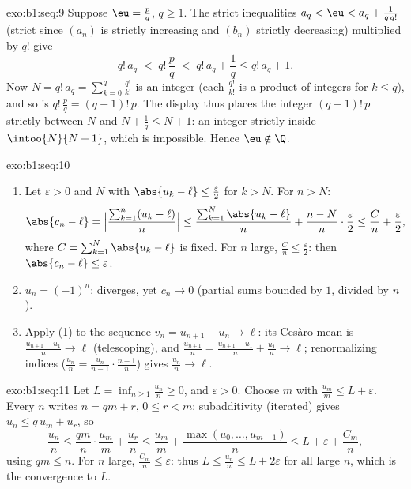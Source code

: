 \begin{solution}{exo:b1:seq:9}
Suppose $\eu = \frac pq$, $q \geq 1$. The strict inequalities $a_q <
\eu < a_q + \frac{1}{q\,q!}$ (strict since $(a_n)$ is strictly
increasing and $(b_n)$ strictly decreasing) multiplied by $q!$ give
\[
q!\,a_q \;<\; q!\,\frac pq \;<\; q!\,a_q + \frac 1q \leq q!\,a_q + 1.
\]
Now $N = q!\,a_q = \sum_{k=0}^{q} \frac{q!}{k!}$ is an integer (each
$\frac{q!}{k!}$ is a product of integers for $k \leq q$), and so is
$q!\,\frac pq = (q-1)!\,p$. The display thus places the integer
$(q-1)!\,p$ strictly between $N$ and $N + \frac 1q \leq N + 1$: an
integer strictly inside $\intoo{N}{N+1}$, which is impossible. Hence
$\eu \notin \Q$.
\end{solution}

\begin{solution}{exo:b1:seq:10}
\begin{enumerate}
  \item Let $\varepsilon > 0$ and $N$ with $\abs{u_k - \ell} \leq
        \frac{\varepsilon}{2}$ for $k > N$. For $n > N$:
        \[
        \abs{c_n - \ell}
        = \Bigl|\frac{\sum_{k=1}^{n}(u_k - \ell)}{n}\Bigr|
        \leq \frac{\sum_{k=1}^{N} \abs{u_k - \ell}}{n}
        + \frac{n - N}{n}\cdot\frac{\varepsilon}{2}
        \leq \frac{C}{n} + \frac{\varepsilon}{2},
        \]
        where $C = \sum_{k=1}^N \abs{u_k - \ell}$ is fixed. For $n$
        large, $\frac Cn \leq \frac\varepsilon2$: then $\abs{c_n -
        \ell} \leq \varepsilon$.
  \item $u_n = (-1)^n$: diverges, yet $c_n \to 0$ (partial sums
        bounded by $1$, divided by $n$).
  \item Apply (1) to the sequence $v_n = u_{n+1} - u_n \to \ell$: its
        Ces\`aro mean is $\frac{u_{n+1} - u_1}{n} \to \ell$
        (telescoping), and $\frac{u_{n+1}}{n} = \frac{u_{n+1} -
        u_1}{n} + \frac{u_1}{n} \to \ell$; renormalizing indices
        ($\frac{u_n}{n} = \frac{u_n}{n-1}\cdot\frac{n-1}{n}$) gives
        $\frac{u_n}{n} \to \ell$.
\end{enumerate}
\end{solution}

\begin{solution}{exo:b1:seq:11}
Let $L = \inf_{n \geq 1} \frac{u_n}{n} \geq 0$, and $\varepsilon >
0$. Choose $m$ with $\frac{u_m}{m} \leq L + \varepsilon$. Every $n$
writes $n = qm + r$, $0 \leq r < m$; subadditivity (iterated) gives
$u_n \leq q\,u_m + u_r$, so
\[
\frac{u_n}{n} \leq \frac{q m}{n}\cdot\frac{u_m}{m} + \frac{u_r}{n}
\leq \frac{u_m}{m} + \frac{\max(u_0, \dots, u_{m-1})}{n}
\leq L + \varepsilon + \frac{C_m}{n},
\]
using $qm \leq n$. For $n$ large, $\frac{C_m}{n} \leq \varepsilon$:
thus $L \leq \frac{u_n}{n} \leq L + 2\varepsilon$ for all large $n$,
which is the convergence to $L$.
\end{solution}

